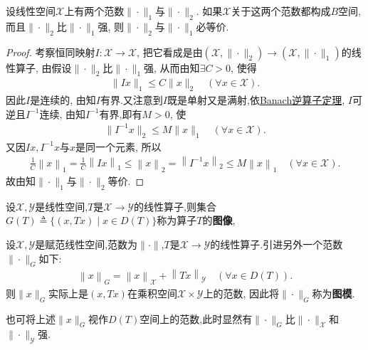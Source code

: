 \documentclass[../../main.tex]{subfiles}%
\begin{document}
\begin{corollary}[等价范数定理]\label{corollary:泛函分析--等价范数定理}
设线性空间$\mathscr{X}$上有两个范数$\|\cdot\|_1$与$\|\cdot\|_2$. 如果$\mathscr{X}$关于这两个范数都构成$B$空间, 而且$\|\cdot\|_2$比$\|\cdot\|_1$强, 则$\|\cdot\|_2$与$\|\cdot\|_1$必等价.
\end{corollary}
\begin{proof}
考察恒同映射$I:\mathscr{X}\to\mathscr{X}$, 把它看成是由$(\mathscr{X},\|\cdot\|_2)\to(\mathscr{X},\|\cdot\|_1)$的线性算子, 由假设$\|\cdot\|_2$比$\|\cdot\|_1$强, 从而由知$\exists C>0$, 使得
\begin{align*}
\|Ix\|_1 \leqslant C\|x\|_2 \quad (\forall x\in\mathscr{X}).
\end{align*}
因此$I$是连续的, 由知$I$有界.又注意到$I$既是单射又是满射,依\hyperref[theorem:泛函分析--Banach逆算子定理]{Banach逆算子定理}, $I$可逆且$I^{-1}$连续, 由知$I^{-1}$有界,即有$M>0$, 使
\begin{align*}
\|I^{-1}x\|_2 \leqslant M\|x\|_1 \quad (\forall x\in\mathscr{X}).
\end{align*}
又因$Ix,I^{-1}x$与$x$是同一个元素, 所以
\begin{align*}
\frac{1}{C}\left\| x \right\| _1=\frac{1}{C}\left\| Ix \right\| _1\leqslant \left\| x \right\| _2=\left\| I^{-1}x \right\| _2\leqslant M\left\| x \right\| _1\quad (\forall x\in \mathscr{X} ).
\end{align*}
故由知$\|\cdot\|_1$与$\|\cdot\|_2$等价.
\end{proof}

\begin{definition}
设$\mathscr{X},\mathscr{Y}$是线性空间,$T$是$\mathscr{X}\to\mathscr{Y}$的线性算子,则集合$G(T)\triangleq\{(x,Tx)\mid x\in D(T)\}$称为算子$T$的\textbf{图像}, 

设$\mathscr{X},\mathscr{Y}$是赋范线性空间,范数为$\|\cdot\|$,$T$是$\mathscr{X}\to\mathscr{Y}$的线性算子.引进另外一个范数$\|\cdot\|_G$如下:
\begin{align*}
\left\| x \right\| _G=\left\| x \right\| _{\mathscr{X}}+\left\| Tx \right\| _{\mathscr{Y}}\quad (\forall x\in D(T)).
\end{align*}
则$\|x\|_G$实际上是$(x,Tx)$在乘积空间$\mathscr{X}\times\mathscr{Y}$上的范数, 因此将$\|\cdot\|_G$称为\textbf{图模}. 
\end{definition}
\begin{remark}
也可将上述$\|x\|_G$视作$D(T)$空间上的范数,此时显然有$\|\cdot\|_G$比$\|\cdot\|_\mathscr{X}$和$\|\cdot\|_\mathscr{Y}$强.
\end{remark}
\end{document}
